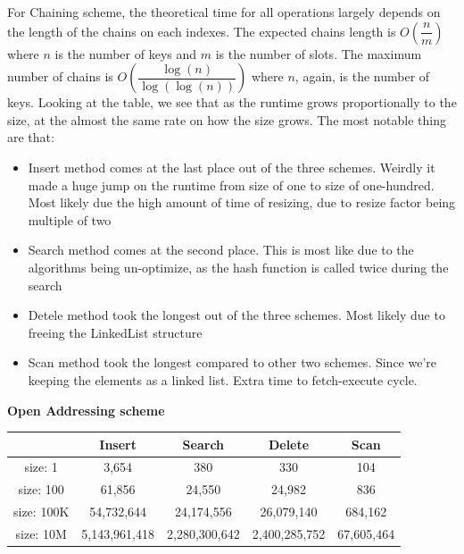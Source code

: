 \documentclass{article} %
\begin{document}
    For Chaining scheme, the theoretical time for all operations largely depends on the length of the chains on each indexes.
    The expected chains length is $O\left(\dfrac{n}{m}\right)$ where $n$ is the number of keys and $m$ is the number of slots.
    The maximum number of chains is $O\left(\dfrac{\log(n)}{\log(\log(n))}\right)$ where $n$, again, is the number of keys.
    Looking at the table, we see that as the runtime grows proportionally to the size, at the almost the same rate on how the size grows.
    The most notable thing are that:
    \begin{itemize}
        \item Insert method comes at the last place out of the three schemes.
        Weirdly it made a huge jump on the runtime from size of one to size of one-hundred.
        Most likely due the high amount of time of resizing, due to resize factor being multiple of two
        \item Search method comes at the second place.
        This is most like due to the algorithms being un-optimize, as the hash function is called twice during the search
        \item Detele method took the longest out of the three schemes.
        Most likely due to freeing the LinkedList structure
        \item Scan method took the longest compared to other two schemes.
        Since we're keeping the elements as a linked list.
        Extra time to fetch-execute cycle.
    \end{itemize}

    \textbf{Open Addressing scheme}
    \begin{center}
        \begin{tabular}{|c|c|c|c|c|}\hline
        & Insert & Search & Delete & Scan\\\hline
        size: 1 & 3,654 & 380 & 330 & 104\\\hline
        size: 100 & 61,856 & 24,550 & 24,982 & 836\\\hline
        size: 100K & 54,732,644 & 24,174,556 & 26,079,140 & 684,162\\\hline
        size: 10M & 5,143,961,418 & 2,280,300,642 & 2,400,285,752 & 67,605,464\\\hline
        \end{tabular}
    \end{center}
\end{document}
